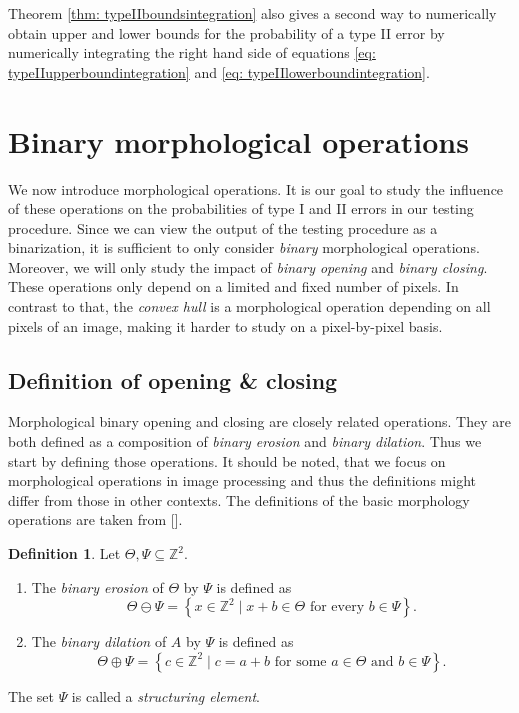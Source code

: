 \documentclass[a4paper,12pt]{article}
\theoremstyle{plain}
\theoremstyle{definition}
\newtheorem{definition}[theorem]{Definition}
\begin{document}
Theorem \ref{thm: typeIIboundsintegration} also gives a second way to numerically obtain upper and lower bounds for the probability of a type II error by numerically integrating the right hand side of equations \eqref{eq: typeIIupperboundintegration} and \eqref{eq: typeIIlowerboundintegration}.

\newpage

\section{Binary morphological operations}\label{section: morphologicaloperations}

We now introduce morphological operations. It is our goal to study the influence of these operations on the probabilities of type I and II errors in our testing procedure. Since we can view the output of the testing procedure as a binarization, it is sufficient to only consider \emph{binary} morphological operations. Moreover, we will only study the impact of \emph{binary opening} and \emph{binary closing}. These operations only depend on a limited and fixed number of pixels. In contrast to that, the \emph{convex hull} is a morphological operation depending on all pixels of an image, making it harder to study on a pixel-by-pixel basis.

\subsection{Definition of opening \& closing}

Morphological binary opening and closing are closely related operations. They are both defined as a composition of \emph{binary erosion} and \emph{binary dilation}. Thus we start by defining those operations. It should be noted, that we focus on morphological operations in image processing and thus the definitions might differ from those in other contexts. The definitions of the basic morphology operations are taken from [].

\begin{definition}
	Let $\Theta, \Psi \subseteq \mathbb{Z}^2$.
	\begin{enumerate}
		\item The \emph{binary erosion} of $\Theta$ by $\Psi$ is defined as
		\begin{equation*}
			\Theta \ominus \Psi = \left\{ x \in \mathbb{Z}^2 \mid x + b \in \Theta \textrm{ for every } b \in \Psi \right\}.
		\end{equation*}
		\item The \emph{binary dilation} of $A$ by $\Psi$ is defined as
		\begin{equation*}
			\Theta \oplus \Psi = \left\{ c \in \mathbb{Z}^2 \mid c = a + b \textrm{ for some } a \in \Theta \textrm{ and } b \in \Psi \right\}.
		\end{equation*}
	\end{enumerate}
	The set $\Psi$ is called a \emph{structuring element}.
\end{definition}
\end{document}
